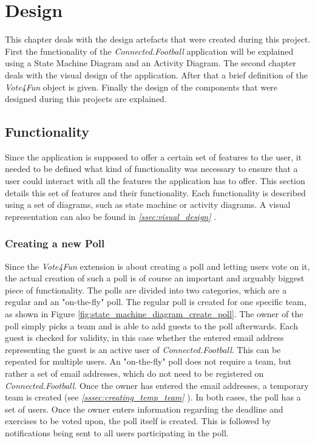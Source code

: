 \section{Design}
\label{sec:desgin}
This chapter deals with the design artefacts that were created during this project. First the functionality of the \textit{Connected.Football} application will be explained using a State Machine Diagram and an Activity Diagram. The second chapter deals with the visual design of the application. After that a brief definition of the \textit{Vote4Fun} object is given. Finally the design of the components that were designed during this projects are explained. 

\subsection{Functionality}
\label{ssec:functionality}

Since the application is supposed to offer a certain set of features to the user, it needed to be defined what kind of functionality was necessary to ensure that a user could interact with all the features the application has to offer. This section details this set of features and their functionality.
\newline
Each functionality is described using a set of diagrams, such as state machine or activity diagrams. A visual representation can also be found in \textit{\ref{ssec:visual_design} }.

\subsubsection{Creating a new Poll}
\label{sssec:creating_a_new_poll}

Since the \textit{Vote4Fun} extension is about creating a poll and letting users vote on it, the actual creation of such a poll is of course an important and arguably biggest piece of functionality. The polls are divided into two categories, which are a regular and an "on-the-fly" poll.
\newline
The regular poll is created for one specific team, as shown in Figure \ref{fig:state_machine_diagram_create_poll}. The owner of the poll simply picks a team and is able to add guests to the poll afterwards. Each guest is checked for validity, in this case whether the entered email address representing the guest is an active user of \textit{Connected.Football}. This can be repeated for multiple users. An "on-the-fly" poll does not require a team, but rather a set of email addresses, which do not need to be registered on \textit{Connected.Football}. Once the owner has entered the email addresses, a temporary team is created (see \textit{\ref{sssec:creating_temp_team} }).
\newline
In both cases, the poll has a set of users. Once the owner enters information regarding the deadline and exercises to be voted upon, the poll itself is created. This is followed by notifications being sent to all users participating in the poll.

